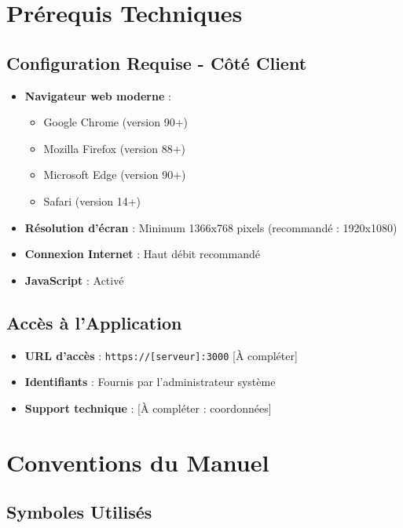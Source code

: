 \documentclass[12pt,a4paper]{report}
\begin{document}
\section{Prérequis Techniques}

\subsection{Configuration Requise - Côté Client}

\begin{itemize}[leftmargin=*]
    \item \textbf{Navigateur web moderne} :
    \begin{itemize}
        \item Google Chrome (version 90+)
        \item Mozilla Firefox (version 88+)
        \item Microsoft Edge (version 90+)
        \item Safari (version 14+)
    \end{itemize}
    \item \textbf{Résolution d'écran} : Minimum 1366x768 pixels (recommandé : 1920x1080)
    \item \textbf{Connexion Internet} : Haut débit recommandé
    \item \textbf{JavaScript} : Activé
\end{itemize}

\subsection{Accès à l'Application}

\begin{itemize}[leftmargin=*]
    \item \textbf{URL d'accès} : \texttt{https://[serveur]:3000} [À compléter]
    \item \textbf{Identifiants} : Fournis par l'administrateur système
    \item \textbf{Support technique} : [À compléter : coordonnées]
\end{itemize}

\section{Conventions du Manuel}

\subsection{Symboles Utilisés}
\end{document}
